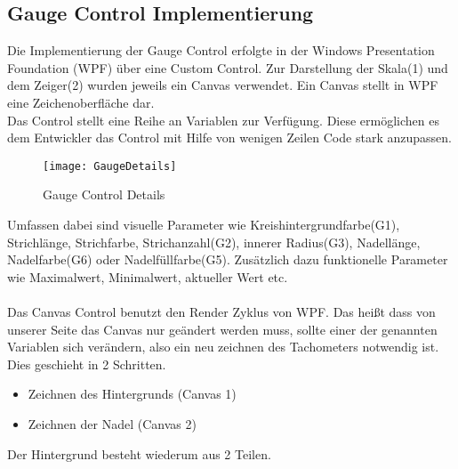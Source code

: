 \subsection{Gauge Control Implementierung}

Die Implementierung der Gauge Control erfolgte in der Windows Presentation Foundation (WPF) über eine Custom Control. Zur Darstellung der Skala(1) und dem Zeiger(2) wurden jeweils ein Canvas verwendet. Ein Canvas stellt in WPF eine Zeichenoberfläche dar.\\



Das Control stellt eine Reihe an Variablen zur Verfügung. Diese ermöglichen es dem Entwickler das Control mit Hilfe von wenigen Zeilen Code stark anzupassen. 
\begin{figure}[ht]
	\centering
	\texttt{[image: GaugeDetails]}
	\caption{Gauge Control Details}
	\label{fig:gauge}
\end{figure}
Umfassen dabei sind visuelle Parameter wie Kreishintergrundfarbe(G1), Strichlänge, Strichfarbe, Strichanzahl(G2), innerer Radius(G3), Nadellänge, Nadelfarbe(G6) oder Nadelfüllfarbe(G5). Zusätzlich dazu funktionelle Parameter wie Maximalwert, Minimalwert, aktueller Wert etc.\\\\

Das Canvas Control benutzt den Render Zyklus von WPF. Das heißt dass von unserer Seite das Canvas nur geändert werden muss, sollte einer der genannten Variablen sich verändern, also ein neu zeichnen des Tachometers notwendig ist.\\
Dies geschieht in 2 Schritten. \\
\begin{itemize}
	\item Zeichnen des Hintergrunds (Canvas 1)
	\item Zeichnen der Nadel (Canvas 2)
\end{itemize}

Der Hintergrund besteht wiederum aus 2 Teilen. \\

